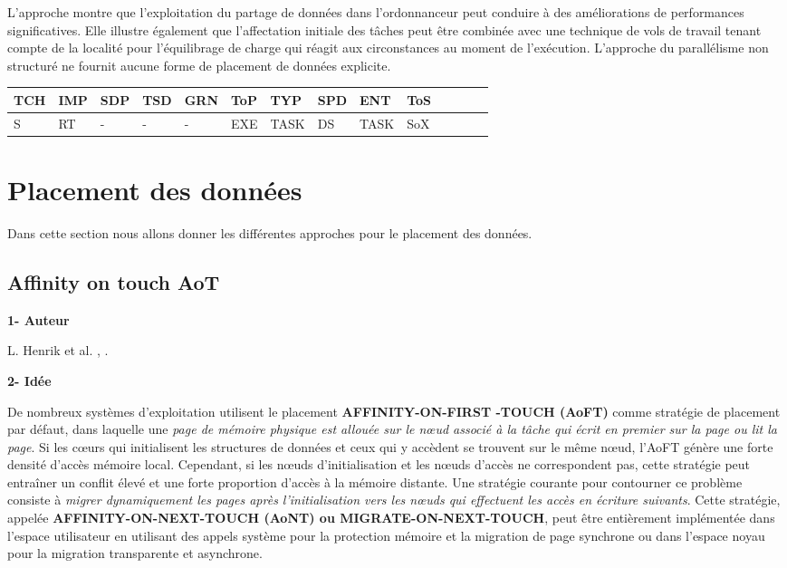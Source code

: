 L'approche montre que l'exploitation du partage de données dans l'ordonnanceur peut conduire à des améliorations de performances significatives. 
Elle illustre également que l'affectation initiale des tâches peut être combinée avec une technique de vols de travail tenant compte de la localité pour l'équilibrage de charge qui réagit aux circonstances au moment de l'exécution. L’approche du parallélisme non structuré ne fournit aucune forme de placement de données explicite. 
%
\begin{center}%
\begin{tabular}{l *{13}{l}} 		\hline
{TCH} & {IMP} 	& {SDP} 	&  {TSD} 	& {GRN} 	& {ToP} 	& {TYP} 	& {SPD}	& {ENT} 	& {ToS} \\     		\hline
S     	& RT		& -		& - 		& -		& EXE		& TASK	& DS 	  	& TASK 	& SoX    \\     		          \hline
\end{tabular}
\end{center} 
\section{Placement des données} \label{placeDT}
%
Dans cette section nous allons donner les différentes approches pour le placement des données.
%
\subsection{Affinity on touch AoT}
%
\textbf{1- Auteur}

L. Henrik et al. \cite{HEN000}, \cite{AffOnNextTouch}.

\textbf{2- Idée}

De nombreux systèmes d'exploitation utilisent le placement \textbf{AFFINITY-ON-FIRST -TOUCH (AoFT)} comme stratégie de placement par défaut, dans laquelle une \textit{page de mémoire physique est allouée sur le nœud associé à la tâche qui écrit en premier sur la page ou lit la page}. 
Si les cœurs qui initialisent les structures de données et ceux qui y accèdent se trouvent sur le même nœud, l'AoFT génère une forte densité d'accès mémoire local. 
Cependant, si les nœuds d'initialisation et les nœuds d'accès ne correspondent pas, cette stratégie peut entraîner un conflit élevé et une forte proportion d'accès à la mémoire distante.
 Une stratégie courante pour contourner ce problème consiste à \textit{migrer dynamiquement les pages après l'initialisation vers les nœuds qui effectuent les accès en écriture suivants}. 
Cette stratégie, appelée \textbf{AFFINITY-ON-NEXT-TOUCH (AoNT) ou MIGRATE-ON-NEXT-TOUCH}, peut être entièrement implémentée dans l'espace utilisateur en utilisant des appels système pour la protection mémoire et la migration de page synchrone ou dans l'espace noyau pour la migration transparente et asynchrone. 

